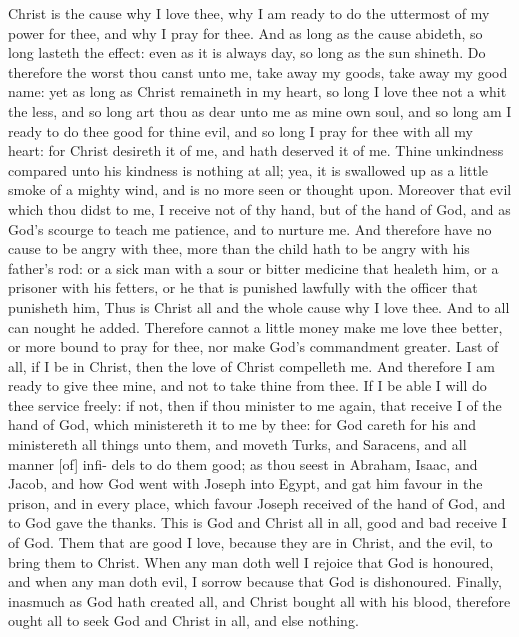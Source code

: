 \documentclass{custom}
\begin{document}
Christ is the cause why I love thee, why I am ready to 
do the uttermost of my power for thee, and why I pray for 
thee. And as long as the cause abideth, so long lasteth 
the effect: even as it is always day, so long as the sun 
shineth. Do therefore the worst thou canst unto me, take 
away my goods, take away my good name: yet as long 
as Christ remaineth in my heart, so long I love thee not a 
whit the less, and so long art thou as dear unto me as 
mine own soul, and so long am I ready to do thee good 
for thine evil, and so long I pray for thee with all my 
heart: for Christ desireth it of me, and hath deserved it 
of me. Thine unkindness compared unto his kindness is 
nothing at all; yea, it is swallowed up as a little smoke of a 
mighty wind, and is no more seen or thought upon. 
Moreover that evil which thou didst to me, I receive not 
of thy hand, but of the hand of God, and as God's 
scourge to teach me patience, and to nurture me. And 
therefore have no cause to be angry with thee, more than 
the child hath to be angry with his father's rod: or a sick 
man with a sour or bitter medicine that healeth him, or a 
prisoner with his fetters, or he that is punished lawfully 
with the officer that punisheth him, Thus is Christ all 
and the whole cause why I love thee. And to all can 
nought he added. Therefore cannot a little money make 
me love thee better, or more bound to pray for thee, nor 
make God's commandment greater. Last of all, if I be 
in Christ, then the love of Christ compelleth me. And 
therefore I am ready to give thee mine, and not to take 
thine from thee. If I be able I will do thee service freely: 
if not, then if thou minister to me again, that receive I of 
the hand of God, which ministereth it to me by thee: for 
God careth for his and ministereth all things unto them, 
and moveth Turks, and Saracens, and all manner [of] infi- 
dels to do them good; as thou seest in Abraham, Isaac, 
and Jacob, and how God went with Joseph into Egypt, 
and gat him favour in the prison, and in every place, which 
favour Joseph received of the hand of God, and to God 
gave the thanks. This is God and Christ all in all, good 
and bad receive I of God. Them that are good I love, 
because they are in Christ, and the evil, to bring them to 
Christ. When any man doth well I rejoice that God is 
honoured, and when any man doth evil, I sorrow because 
that God is dishonoured. Finally, inasmuch as God 
hath created all, and Christ bought all with his blood, 
therefore ought all to seek God and Christ in all, and else 
nothing. 
\end{document}
